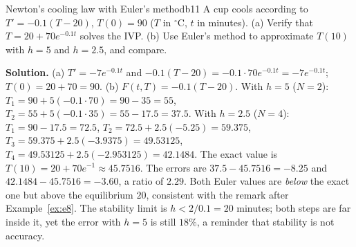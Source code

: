 \documentclass[11pt]{article}
\begin{document}
\begin{exmp}{Newton's cooling law with Euler's method}{b11}
A cup cools according to $T'=-0.1(T-20)$, $T(0)=90$ ($T$ in $^\circ$C, $t$ in minutes). (a) Verify that $T=20+70e^{-0.1t}$ solves the IVP. (b) Use Euler's method to approximate $T(10)$ with $h=5$ and $h=2.5$, and compare.

\textbf{Solution.} (a) $T'=-7e^{-0.1t}$ and $-0.1(T-20)=-0.1\cdot70e^{-0.1t}=-7e^{-0.1t}$; $T(0)=20+70=90$.
(b) $F(t,T)=-0.1(T-20)$. With $h=5$ ($N=2$): $T_1=90+5(-0.1\cdot70)=90-35=55$, $T_2=55+5(-0.1\cdot35)=55-17.5=37.5$. With $h=2.5$ ($N=4$): $T_1=90-17.5=72.5$, $T_2=72.5+2.5(-5.25)=59.375$, $T_3=59.375+2.5(-3.9375)=49.53125$, $T_4=49.53125+2.5(-2.953125)=42.1484$. The exact value is $T(10)=20+70e^{-1}\approx45.7516$. The errors are $37.5-45.7516=-8.25$ and $42.1484-45.7516=-3.60$, a ratio of $2.29$. Both Euler values are \emph{below} the exact one but above the equilibrium $20$, consistent with the remark after Example~\ref{ex:e8}. The stability limit is $h<2/0.1=20$ minutes; both steps are far inside it, yet the error with $h=5$ is still $18\%$, a reminder that stability is not accuracy.
\end{exmp}
\end{document}

